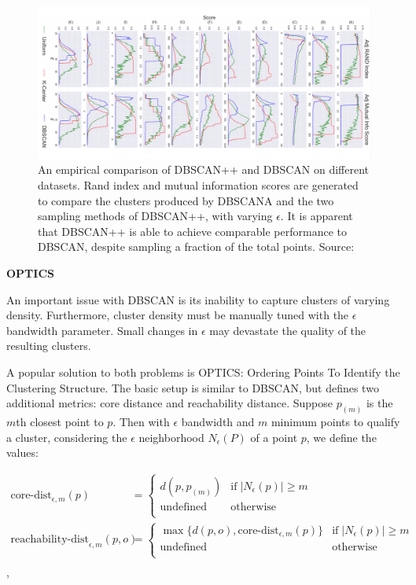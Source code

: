 \begin{figure}[h]
\centering
\includegraphics[scale=0.20,angle=90]{chapter_2/files/dbscan_plus_scores.png}
\caption{An empirical comparison of DBSCAN++ and DBSCAN on different datasets. Rand index and mutual information scores are generated to compare the clusters produced by DBSCANA and the two sampling methods of DBSCAN++, with varying $\epsilon$. It is apparent that DBSCAN++ is able to achieve comparable performance to DBSCAN, despite sampling a fraction of the total points. Source: \cite{dbscanpp}}
\label{fig:dbscan_plus_scores}
\end{figure}

\noindent \textbf{OPTICS}

An important issue with DBSCAN is its inability to capture clusters of varying density. Furthermore, cluster density must be manually tuned with the $\epsilon$ bandwidth parameter. Small changes in $\epsilon$ may devastate the quality of the resulting clusters.

A popular solution to both problems is OPTICS: Ordering Points To Identify the Clustering Structure. The basic setup is similar to DBSCAN, but defines two additional metrics: core distance and reachability distance. Suppose $p_{(m)}$ is the $m$th closest point to $p$. Then with $\epsilon$ bandwidth and $m$ minimum points to qualify a cluster, considering the $\epsilon$ neighborhood $N_\epsilon(P)$ of a point $p$, we define the values:

\begin{align*}
    \text{core-dist}_{\epsilon, m}(p) &= 
        \begin{cases}
            d(p, p_{(m)}) & \text{if}\; |N_\epsilon(p)| \geq m \\
            \text{undefined} & \text{otherwise} \\
        \end{cases}\\
    \text{reachability-dist}_{\epsilon, m}(p, o) &= 
        \begin{cases}
            \max \lbrace d(p, o), \text{core-dist}_{\epsilon, m} (p) \rbrace & \text{if}\; |N_\epsilon(p)| \geq m \\
            \text{undefined} & \text{otherwise} \\
        \end{cases}\\
\end{align*} \cite{wiki:optics}, \cite{medium:optics}

